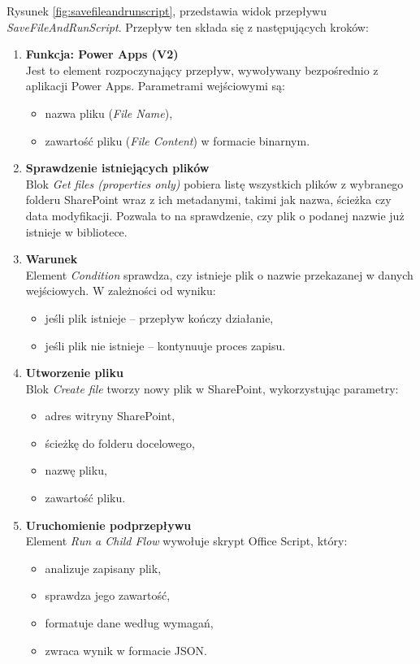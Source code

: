 Rysunek \ref{fig:savefileandrunscript}, przedstawia widok przepływu \emph{SaveFileAndRunScript}. Przepływ ten składa się z następujących kroków:
\begin{enumerate}
    \item \textbf{Funkcja: Power Apps (V2)} \\
    Jest to element rozpoczynający przepływ, wywoływany bezpośrednio z aplikacji Power Apps. Parametrami wejściowymi są:
    \begin{itemize}
        \item nazwa pliku (\textit{File Name}),
        \item zawartość pliku (\textit{File Content}) w formacie binarnym.
    \end{itemize}

    \item \textbf{Sprawdzenie istniejących plików} \\
    Blok \textit{Get files (properties only)} pobiera listę wszystkich plików z wybranego folderu SharePoint wraz z ich metadanymi, takimi jak nazwa, ścieżka czy data modyfikacji. Pozwala to na sprawdzenie, czy plik o podanej nazwie już istnieje w bibliotece.

    \item \textbf{Warunek} \\
    Element \textit{Condition} sprawdza, czy istnieje plik o nazwie przekazanej w danych wejściowych. W zależności od wyniku:
    \begin{itemize}
        \item jeśli plik istnieje -- przepływ kończy działanie,
        \item jeśli plik nie istnieje -- kontynuuje proces zapisu.
    \end{itemize}

    \item \textbf{Utworzenie pliku} \\
    Blok \textit{Create file} tworzy nowy plik w SharePoint, wykorzystując parametry:
    \begin{itemize}
        \item adres witryny SharePoint,
        \item ścieżkę do folderu docelowego,
        \item nazwę pliku,
        \item zawartość pliku.
    \end{itemize}

    \item \textbf{Uruchomienie podprzepływu} \\
    Element \textit{Run a Child Flow} wywołuje skrypt Office Script, który:
    \begin{itemize}
        \item analizuje zapisany plik,
        \item sprawdza jego zawartość,
        \item formatuje dane według wymagań,
        \item zwraca wynik w formacie JSON.
    \end{itemize}


\end{enumerate}
